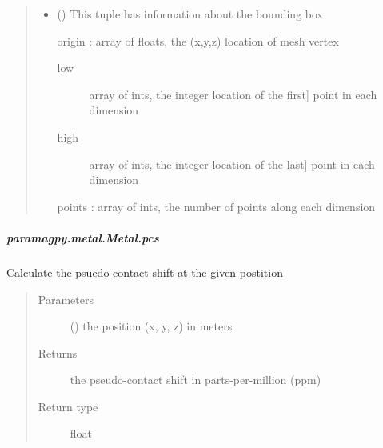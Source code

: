 \documentclass[a4paper,10pt,english,openany,oneside]{sphinxmanual}
\begin{document}
\begin{fulllineitems}
\begin{fulllineitems}
\begin{fulllineitems}
\begin{quote}
\begin{description}
\begin{itemize}
\item {} 
 () \textendash{} This tuple has information about the bounding box

origin : array of floats, the (x,y,z) location of mesh vertex
\begin{description}
\item[{low}] \leavevmode{[}array of ints, the integer location of the first{]}
point in each dimension

\item[{high}] \leavevmode{[}array of ints, the integer location of the last{]}
point in each dimension

\end{description}

points : array of ints, the number of points along each dimension

\end{itemize}


\end{description}\end{quote}

\end{fulllineitems}



\subparagraph{paramagpy.metal.Metal.pcs}
\label{\detokenize{reference/generated/paramagpy.metal.Metal.pcs:paramagpy-metal-metal-pcs}}\label{\detokenize{reference/generated/paramagpy.metal.Metal.pcs::doc}}

\begin{fulllineitems}
\label{\detokenize{reference/generated/paramagpy.metal.Metal.pcs:paramagpy.metal.Metal.pcs}}
Calculate the psuedo-contact shift at the given postition
\begin{quote}\begin{description}
\item[{Parameters}] \leavevmode
{} () \textendash{} the position (x, y, z) in meters

\item[{Returns}] \leavevmode
{} \textendash{} the pseudo-contact shift in parts-per-million (ppm)

\item[{Return type}] \leavevmode
float


\end{description}
\end{quote}
\end{fulllineitems}
\end{fulllineitems}
\end{fulllineitems}
\end{document}

